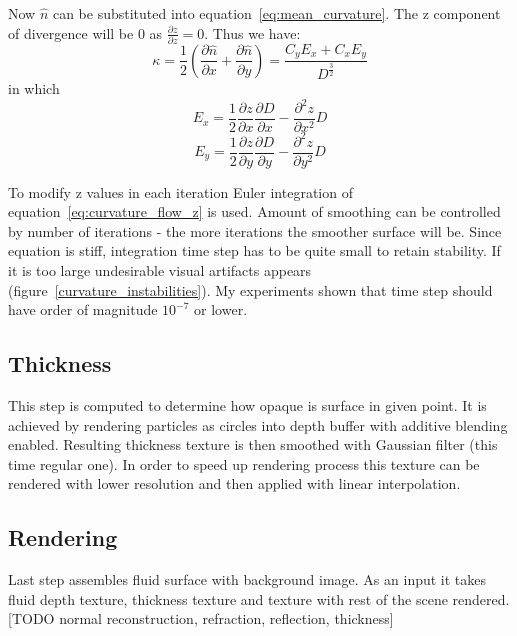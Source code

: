 Now $\hat{n}$ can be substituted into equation~\ref{eq:mean_curvature}. The z component of divergence will be 0 as $\frac{\partial z}{\partial z} = 0$. Thus we have:
\begin{equation}
\kappa = \frac{1}{2} \left( \frac{\partial \hat{n}}{\partial x} + \frac{\partial \hat{n}}{\partial y} \right) = \frac{C_y E_x + C_x E_y}{D^{\frac{3}{2}}}
\end{equation}
in which 
\begin{equation}
E_x = \frac{1}{2} \frac{\partial z}{\partial x} \frac{\partial D}{\partial x} - \frac{\partial^2 z}{\partial x^2}D
\end{equation}
\begin{equation}
E_y = \frac{1}{2} \frac{\partial z}{\partial y} \frac{\partial D}{\partial y} - \frac{\partial^2 z}{\partial y^2}D
\end{equation}

To modify z values in each iteration Euler integration of equation~\ref{eq:curvature_flow_z} is used. Amount of smoothing can be controlled by number of iterations - the more iterations the smoother surface will be. Since equation is stiff, integration time step has to be quite small to retain stability. If it is too large undesirable visual artifacts appears (figure~\ref{curvature_instabilities}). My experiments shown that time step should have order of magnitude $10^{-7}$ or lower.

\subsection{Thickness} \label{sec:thickness}
This step is computed to determine how opaque is surface in given point. It is achieved by rendering particles as circles into depth buffer with additive blending enabled. Resulting thickness texture is then smoothed with Gaussian filter (this time regular one). In order to speed up rendering process this texture can be rendered with lower resolution and then applied with linear interpolation. 

\subsection{Rendering} \label{sec:rendering}
Last step assembles fluid surface with background image. As an input it takes fluid depth texture, thickness texture and texture with rest of the scene rendered. 
[TODO normal reconstruction, refraction, reflection, thickness]

